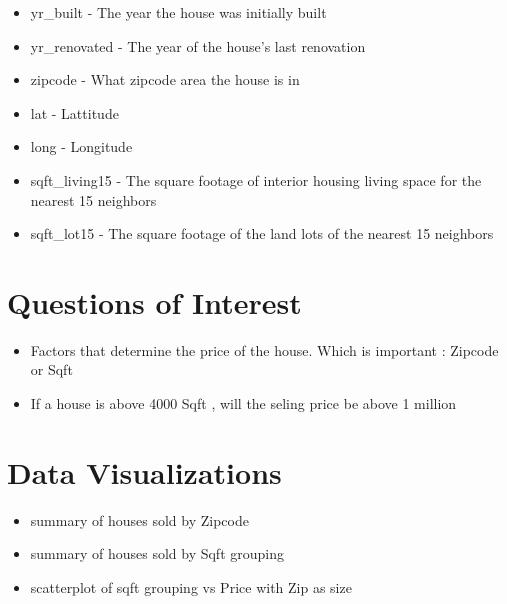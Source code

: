 \documentclass{article}
\begin{document}
{\begin{itemize}
    \item yr\_built - The year the house was initially built \\
    \item yr\_renovated - The year of the house’s last renovation\\
    \item zipcode - What zipcode area the house is in \\
    \item lat - Lattitude \\
    \item long - Longitude \\
    \item sqft\_living15 - The square footage of interior housing living space for the nearest 15 neighbors \\
    \item sqft\_lot15 - The square footage of the land lots of the nearest 15 neighbors \\

\end{itemize}
 }


\section{Questions of Interest  }

\begin{itemize}
    \item Factors that determine the price of the house. Which is important : Zipcode or Sqft
    \item If a house is above 4000 Sqft , will the seling price be above 1 million
\end{itemize}

\section{Data Visualizations }

\begin{itemize}
    \item summary of houses sold by Zipcode
    \item summary of houses sold by Sqft grouping 
    \item scatterplot of sqft grouping vs Price with Zip as size
    
\end{itemize}


  
\end{document}
